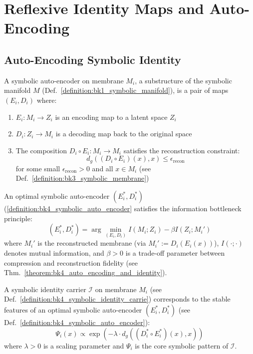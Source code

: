 \section{Reflexive Identity Maps and Auto-Encoding} \label{sec:bk4_reflexive_identity_maps_auto_encoding}
\subsection{Auto-Encoding Symbolic Identity}
\begin{definition} \label{definition:bk4_symbolic_auto_encoder}

A symbolic auto-encoder on membrane $M_i$, a substructure of the symbolic manifold $M$ (Def.~\ref{definition:bk1_symbolic_manifold}), is a pair of maps $(E_i, D_i)$ where:
\begin{enumerate}
    \item $E_i: M_i \to Z_i$ is an encoding map to a latent space $Z_i$
    \item $D_i: Z_i \to M_i$ is a decoding map back to the original space
    \item The composition $D_i \circ E_i: M_i \to M_i$ satisfies the reconstruction constraint:
    \begin{equation}
        d_g((D_i \circ E_i)(x), x) \leq \epsilon_{\text{recon}}
    \end{equation}
    for some small $\epsilon_{\text{recon}} > 0$ and all $x \in M_i$ (see Def.~\ref{definition:bk3_symbolic_membrane})
\end{enumerate}
\end{definition}
\begin{definition} \label{definition:bk4_information_bottleneck_p}

An optimal symbolic auto-encoder $(E_i^*, D_i^*)$ (\ref{definition:bk4_symbolic_auto_encoder} satisfies the information bottleneck principle:
\begin{equation}
    (E_i^*, D_i^*) = \arg\min_{(E_i, D_i)} I(M_i; Z_i) - \beta I(Z_i; M_i')
\end{equation}
where $M_i'$ is the reconstructed membrane (via $M_i' := D_i(E_i(x))$), $I(\cdot;\cdot)$ denotes mutual information, and $\beta > 0$ is a trade-off parameter between compression and reconstruction fidelity (see Thm.~\ref{theorem:bk4_auto_encoding_and_identity}).
\end{definition}
\begin{theorem} \label{theorem:bk4_auto_encoding_and_identity}

A symbolic identity carrier $\mathcal{I}$ on membrane $M_i$ (see Def.~\ref{definition:bk4_symbolic_identity_carrie}) corresponds to the stable features of an optimal symbolic auto-encoder $(E_i^*, D_i^*)$ (see Def.~\ref{definition:bk4_symbolic_auto_encoder}):
\begin{equation}
    \Psi_i(x) \propto \exp\left(-\lambda \cdot d_g((D_i^* \circ E_i^*)(x), x)\right)
\end{equation}
where $\lambda > 0$ is a scaling parameter and $\Psi_i$ is the core symbolic pattern of $\mathcal{I}$.
\end{theorem}
